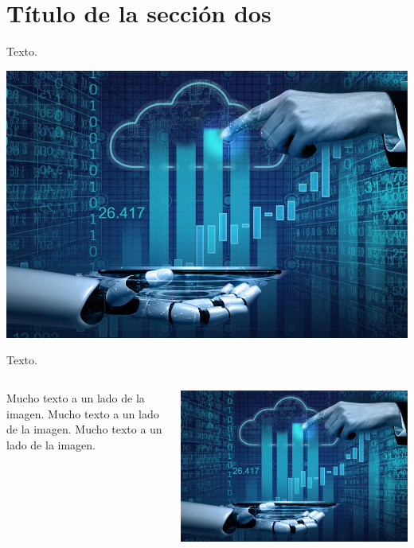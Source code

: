 \section{Título de la sección dos}


\begin{frame}
    Texto.
    
    \begin{center}
        \includegraphics[width=0.5\linewidth]{Figuras/fig01.jpg}
    \end{center}
\end{frame}


\begin{frame}
    Texto.
    
    \begin{center}
    \end{center}
\end{frame}


\begin{frame}
    \begin{columns}
        Mucho texto a un lado de la imagen. Mucho texto a un lado de la imagen. Mucho texto a un lado de la imagen.
    
        \begin{center}
            \includegraphics[width=0.8\linewidth]{Figuras/fig01.jpg}
        \end{center}
    
    \end{columns}
\end{frame}


